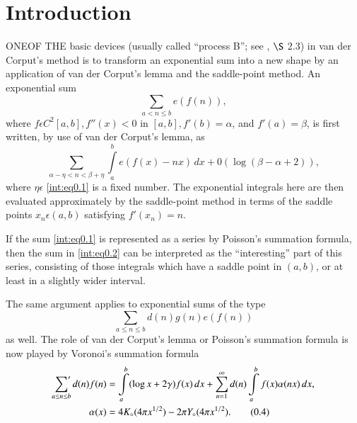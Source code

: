 \chapter*{Introduction}




ONE\pageoriginale OF THE basic devices (usually called ``process B'';
see \cite{key13}, $\S$ 2.3) in van der Corput's method is to transform
an exponential sum into a new shape by an application of van der
Corput's lemma and the saddle-point method. An exponential sum 
\begin{equation}
\sum\limits_{a<n\leq b} e(f(n)),\tag{0.1}\label{int:eq0.1}
\end{equation}
where $f\epsilon C^2[a,b], f''(x)<0$ in $[a,b],f'(b)=\alpha$, and
$f'(a)=\beta$, is first written, by use of van der Corput's lemma, as 
\begin{equation}
\sum\limits_{\alpha -\eta<n<\beta +\eta} \int\limits_a^b e(f(x)-nx)\,dx
+0 (\log(\beta -\alpha +2)),\tag{0.2}\label{int:eq0.2}
\end{equation}
where $\eta\epsilon$ \eqref{int:eq0.1} is a fixed number. The exponential
integrals here are then evaluated approximately by the saddle-point
method in terms of the saddle points $x_n\epsilon(a,b)$ satisfying
$f'(x_n)=n$. 

If the sum \eqref{int:eq0.1} is represented as a series by Poisson's
summation formula, then the sum in \eqref{int:eq0.2} can be
interpreted as the ``interesting'' part of this series, consisting of
those integrals which have a saddle point in $(a,b)$, or at least in a
slightly wider interval. 

The same argument applies to exponential sums of the type 
\begin{equation}
\sum\limits_{a\leq n\leq b} d(n)g(n)e(f(n))\tag{0.3}\label{int:eq0.3}
\end{equation}
as well. The role of van der Corput's lemma or Poisson's summation
formula is now played by Voronoi's summation formula 
\begin{align*}
\sideset{}{'}\sum\limits_{a\leq n\leq b}d(n)f(n) &= \int\limits_a^b(\log
x+2\gamma)f(x)\,dx+\sum\limits_{n=1}^\infty d(n)\int\limits_a^b
f(x)\alpha(nx)\,dx,\\
\alpha (x) & =4K_\circ(4\pi x^{1/2})-2\pi Y_\circ(4\pi x^{1/2}).\notag
\tag{0.4}\label{int:eq0.4} 
\end{align*}\pageoriginale

